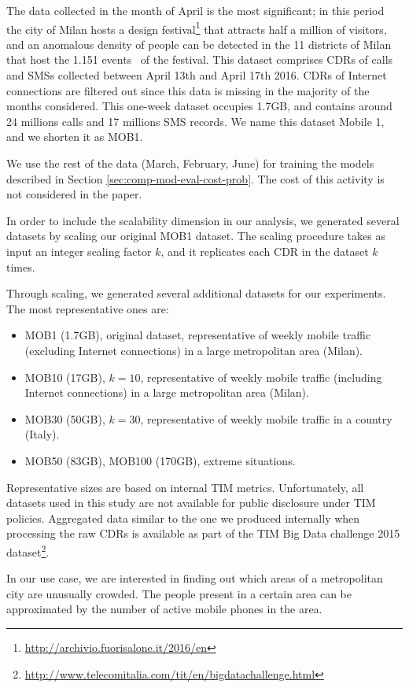 {The data collected in the month of April is the most significant; in this period the city of Milan hosts a design festival\footnote{\url{http://archivio.fuorisalone.it/2016/en}} that attracts half a million of visitors, and an anomalous density of people can be detected in the 11 districts of Milan that host the 1.151 events~\cite{DBLP:journals/ieeemm/BalduiniVALAC15} of the festival. This dataset comprises CDRs of calls and SMSs collected between April 13th and April 17th 2016. CDRs of Internet connections are filtered out since this data is missing in the majority of the months considered. This one-week dataset occupies 1.7GB, and contains around 24 millions calls and 17 millions SMS records. We name this dataset Mobile 1, and we shorten it as MOB1. 

We use the rest of the data (March, February, June) for training the models described in Section \ref{sec:comp-mod-eval-cost-prob}. The cost of this activity is not considered in the paper.

In order to include the scalability dimension in our analysis, we generated several datasets by scaling our original MOB1 dataset. The scaling procedure takes as input an integer scaling factor $k$, and it replicates each CDR in the dataset $k$ times.

Through scaling, we generated several additional datasets for our experiments. The most representative ones are:
\begin{itemize}
\item MOB1 (1.7GB), original dataset, representative of weekly mobile traffic (excluding Internet connections) in a large metropolitan area (Milan).
\item MOB10 (17GB), $k = 10$, representative of weekly mobile traffic (including Internet connections) in a large metropolitan area (Milan).
\item MOB30 (50GB), $k = 30$, representative of weekly mobile traffic in a country (Italy).
\item MOB50 (83GB), MOB100 (170GB), extreme situations.
\end{itemize}
Representative sizes are based on internal TIM metrics. Unfortunately, all datasets used in this study are not available for public disclosure under TIM policies. Aggregated data similar to the one we produced internally when processing the raw CDRs is available as part of the TIM Big Data challenge 2015 dataset\footnote{\url{http://www.telecomitalia.com/tit/en/bigdatachallenge.html}}.

In our use case, we are interested in finding out which areas of a metropolitan city are unusually crowded. The people present in a certain area can be approximated by the number of active mobile phones in the area.

}
